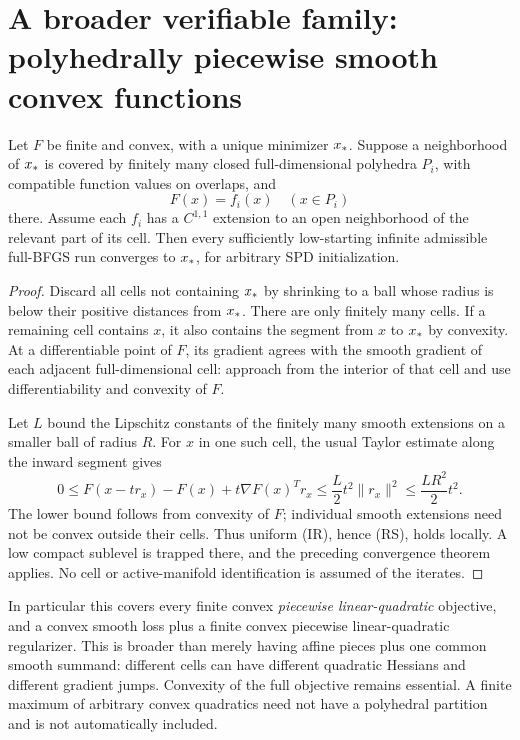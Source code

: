 \section{A broader verifiable family: polyhedrally piecewise smooth convex functions}
\begin{theorem}\label{R:thm:plq}
Let $F$ be finite and convex, with a unique minimizer $x_*$. Suppose a neighborhood of $x_*$ is covered by finitely many closed full-dimensional polyhedra $P_i$, with compatible function values on overlaps, and
\[
 F(x)=f_i(x)\quad(x\in P_i)
\]
there. Assume each $f_i$ has a $C^{1,1}$ extension to an open neighborhood of the relevant part of its cell. Then every sufficiently low-starting infinite admissible full-BFGS run converges to $x_*$, for arbitrary SPD initialization.
\end{theorem}
\begin{proof}
Discard all cells not containing $x_*$ by shrinking to a ball whose radius is below their positive distances from $x_*$. There are only finitely many cells. If a remaining cell contains $x$, it also contains the segment from $x$ to $x_*$ by convexity. At a differentiable point of $F$, its gradient agrees with the smooth gradient of each adjacent full-dimensional cell: approach from the interior of that cell and use differentiability and convexity of $F$.

Let $L$ bound the Lipschitz constants of the finitely many smooth extensions on a smaller ball of radius $R$. For $x$ in one such cell, the usual Taylor estimate along the inward segment gives
\[
 0\le F(x-t r_x)-F(x)+t\nabla F(x)^Tr_x
 \le\frac L2 t^2\|r_x\|^2\le\frac{LR^2}{2}t^2.
\]
The lower bound follows from convexity of $F$; individual smooth extensions need not be convex outside their cells. Thus uniform (IR), hence (RS), holds locally. A low compact sublevel is trapped there, and the preceding convergence theorem applies. No cell or active-manifold identification is assumed of the iterates.
\end{proof}
In particular this covers every finite convex \emph{piecewise linear-quadratic} objective, and a convex smooth loss plus a finite convex piecewise linear-quadratic regularizer. This is broader than merely having affine pieces plus one common smooth summand: different cells can have different quadratic Hessians and different gradient jumps. Convexity of the full objective remains essential. A finite maximum of arbitrary convex quadratics need not have a polyhedral partition and is not automatically included.


